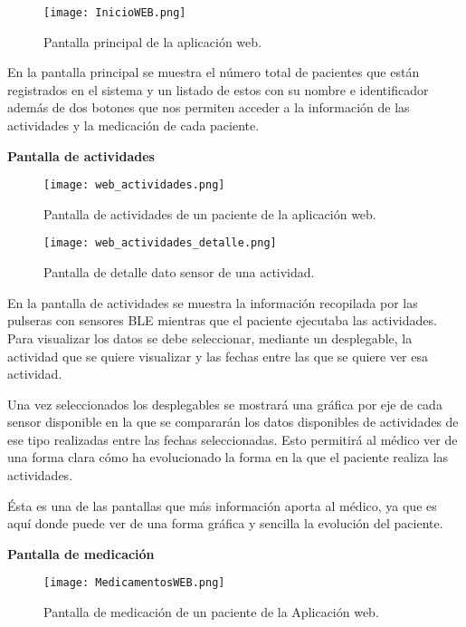 \documentclass[11pt,spanish]{article}
\begin{document}
\begin{figure}[H]
  \centering
  \texttt{[image: InicioWEB.png]}
  \caption{Pantalla principal de la aplicación web.}
\end{figure}

En la pantalla principal se muestra el número total de pacientes que están registrados en el sistema y un listado de estos con su nombre e identificador además de dos botones que nos permiten acceder a la información de las actividades y la medicación de cada paciente.
\newline
\newline

\textbf{Pantalla de actividades}
\newline

\begin{figure}[H]
  \centering
  \texttt{[image: web\_actividades.png]}
  \caption{Pantalla de actividades de un paciente de la aplicación web.}
\end{figure}

\begin{figure}[H]
  \centering
  \texttt{[image: web\_actividades\_detalle.png]}
  \caption{Pantalla de detalle dato sensor de una actividad.}
\end{figure}

En la pantalla de actividades se muestra la información recopilada por las pulseras con sensores BLE mientras que el paciente ejecutaba las actividades. Para visualizar los datos se debe seleccionar, mediante un desplegable, la actividad que se quiere visualizar y las fechas entre las que se quiere ver esa actividad.
\newline

Una vez seleccionados los desplegables se mostrará una gráfica por eje de cada sensor disponible en la que se compararán los datos disponibles de actividades de ese tipo realizadas entre las fechas seleccionadas. Esto permitirá al médico ver de una forma clara cómo ha evolucionado la forma en la que el paciente realiza las actividades.
\newline

Ésta es una de las pantallas que más información aporta al médico, ya que es aquí donde puede ver de una forma gráfica y sencilla la evolución del paciente.
\newline

\textbf{Pantalla de medicación}
\newline

\begin{figure}[H]
  \centering
  \texttt{[image: MedicamentosWEB.png]}
  \caption{Pantalla de medicación de un paciente de la Aplicación web.}
\end{figure}
\end{document}
